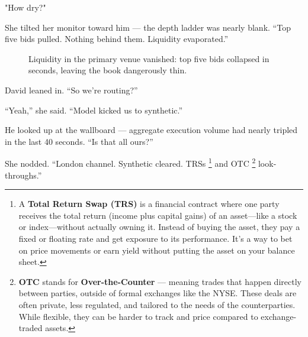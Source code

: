 "How dry?"

She tilted her monitor toward him — the depth ladder was nearly blank.
“Top five bids pulled. Nothing behind them. Liquidity evaporated.”

\medskip

\begin{figure}[H]
  \centering
  \caption{Liquidity in the primary venue vanished: top five bids collapsed in seconds, leaving the book dangerously thin.}
\end{figure}

\medskip

David leaned in. “So we’re routing?”

“Yeah,” she said. “Model kicked us to synthetic.”

He looked up at the wallboard — aggregate execution volume had nearly tripled in the last 40 seconds.
“Is that all ours?”

She nodded. “London channel. Synthetic cleared. TRSs
\footnote{A \textbf{Total Return Swap (TRS)} is a financial contract where one party receives the total return (income 
plus capital gains) of an asset—like a stock or index—without actually owning it. Instead of buying the asset, they pay 
a fixed or floating rate and get exposure to its performance. It's a way to bet on price movements or earn yield without 
putting the asset on your balance sheet.}
and OTC
\footnote{\textbf{OTC} stands for \textbf{Over-the-Counter} — meaning trades that happen directly between parties, outside 
of formal exchanges like the NYSE. These deals are often private, less regulated, and tailored to the needs of the 
counterparties. While flexible, they can be harder to track and price compared to exchange-traded assets.}
look-throughs.”

